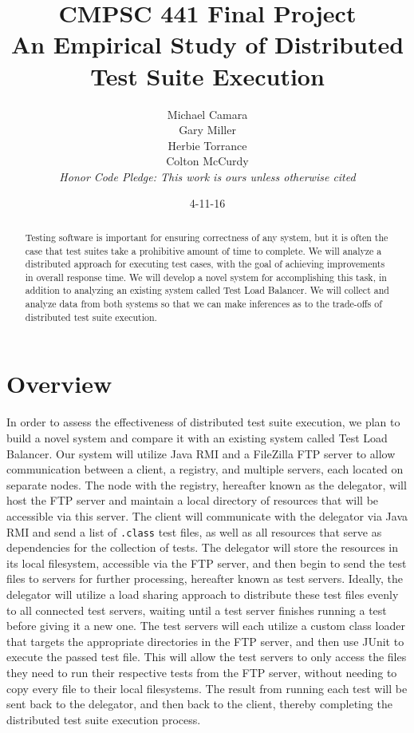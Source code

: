\documentclass[12pt]{article}
\begin{document}
\title{CMPSC 441 Final Project\\An Empirical Study of Distributed Test Suite Execution}
\author{Michael Camara\\Gary Miller\\Herbie Torrance\\Colton McCurdy\\\textit{Honor Code Pledge: This work is ours unless otherwise cited}}
\date{4-11-16}
\maketitle

\begin{abstract}
Testing software is important for ensuring correctness of any system, but it is often the case that test suites take a prohibitive amount of time to complete.  We will analyze a distributed approach for executing test cases, with the goal of achieving improvements in overall response time.  We will develop a novel system for accomplishing this task, in addition to analyzing an existing system called Test Load Balancer.  We will collect and analyze data from both systems so that we can make inferences as to the trade-offs of distributed test suite execution.
\end{abstract}

\section{Overview}
In order to assess the effectiveness of distributed test suite execution, we plan to build a novel system and compare it with an existing system called Test Load Balancer.  Our system will utilize Java RMI and a FileZilla FTP server to allow communication between a client, a registry, and multiple servers, each located on separate nodes.  The node with the registry, hereafter known as the delegator, will host the FTP server and maintain a local directory of resources that will be accessible via this server.  The client will communicate with the delegator via Java RMI and send a list of \texttt{.class} test files, as well as all resources that serve as dependencies for the collection of tests.  The delegator will store the resources in its local filesystem, accessible via the FTP server, and then begin to send the test files to servers for further processing, hereafter known as test servers.  Ideally, the delegator will utilize a load sharing approach to distribute these test files evenly to all connected test servers, waiting until a test server finishes running a test before giving it a new one.  The test servers will each utilize a custom class loader that targets the appropriate directories in the FTP server, and then use JUnit to execute the passed test file.  This will allow the test servers to only access the files they need to run their respective tests from the FTP server, without needing to copy every file to their local filesystems.  The result from running each test will be sent back to the delegator, and then back to the client, thereby completing the distributed test suite execution process.
\end{document}
